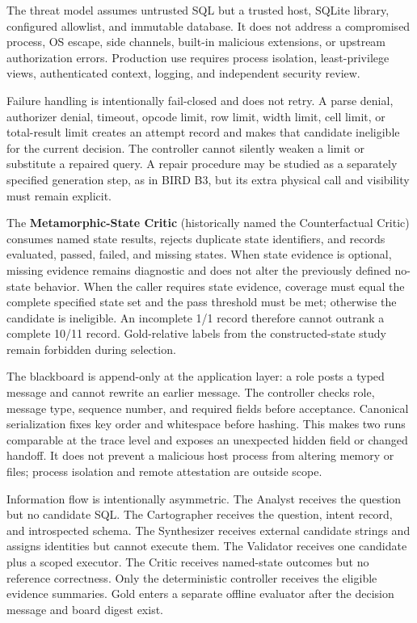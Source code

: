 \documentclass[information,article,submit,moreauthors]{Definitions/mdpi}
\begin{document}
The threat model assumes untrusted SQL but a trusted host, SQLite library, configured allowlist, and immutable database. It does not address a compromised process, OS escape, side channels, built-in malicious extensions, or upstream authorization errors. Production use requires process isolation, least-privilege views, authenticated context, logging, and independent security review.

Failure handling is intentionally fail-closed and does not retry. A parse denial, authorizer denial, timeout, opcode limit, row limit, width limit, cell limit, or total-result limit creates an attempt record and makes that candidate ineligible for the current decision. The controller cannot silently weaken a limit or substitute a repaired query. A repair procedure may be studied as a separately specified generation step, as in BIRD B3, but its extra physical call and visibility must remain explicit.

The \textbf{Metamorphic-State Critic} (historically named the Counterfactual Critic) consumes named state results, rejects duplicate state identifiers, and records evaluated, passed, failed, and missing states. When state evidence is optional, missing evidence remains diagnostic and does not alter the previously defined no-state behavior. When the caller requires state evidence, coverage must equal the complete specified state set and the pass threshold must be met; otherwise the candidate is ineligible. An incomplete 1/1 record therefore cannot outrank a complete 10/11 record. Gold-relative labels from the constructed-state study remain forbidden during selection.

The blackboard is append-only at the application layer: a role posts a typed message and cannot rewrite an earlier message. The controller checks role, message type, sequence number, and required fields before acceptance. Canonical serialization fixes key order and whitespace before hashing. This makes two runs comparable at the trace level and exposes an unexpected hidden field or changed handoff. It does not prevent a malicious host process from altering memory or files; process isolation and remote attestation are outside scope.

Information flow is intentionally asymmetric. The Analyst receives the question but no candidate SQL. The Cartographer receives the question, intent record, and introspected schema. The Synthesizer receives external candidate strings and assigns identities but cannot execute them. The Validator receives one candidate plus a scoped executor. The Critic receives named-state outcomes but no reference correctness. Only the deterministic controller receives the eligible evidence summaries. Gold enters a separate offline evaluator after the decision message and board digest exist.
\end{document}
